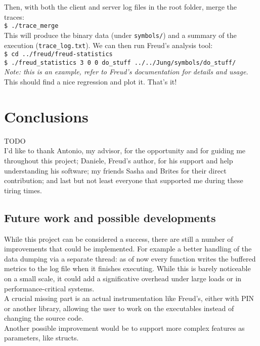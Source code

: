         Then, with both the client and server log files in the root folder, merge the traces:\\

        \texttt{\$ ./trace\_merge}\\

        This will produce the binary data (under \texttt{symbols/}) and a summary of the execution
        (\texttt{trace\_log.txt}).
        We can then run Freud's analysis tool:\\

        \texttt{\$ cd ../freud/freud-statistics}\\

        \texttt{\$ ./freud\_statistics 3 0 0 do\_stuff ../../Jung/symbols/do\_stuff/}\\
        
        \textit{Note: this is an example, refer to Freud's documentation for details and usage.}\\

        This should find a nice regression and plot it. That's it!


\chapter{Conclusions}


    TODO\\

    I'd like to thank Antonio, my advisor, for the opportunity and for guiding me throughout
    this project; Daniele, Freud's author, for his support and help
    understanding his software; my friends Sasha and Brites for their direct contribution;
    and last but not least everyone that supported me during these tiring times.


	\section{Future work and possible developments}

        While this project can be considered a success, there are still a number of improvements
        that could be implemented. For example a better handling of the data dumping via a separate thread:
        as of now every function writes the buffered metrics to the log file when it finishes executing. While this
        is barely noticeable on a small scale, it could add a significative overhead under large loads
        or in performance-critical systems.\\

        A crucial missing part is an actual instrumentation like Freud's, either with PIN or another
        library, allowing the user to work on the executables instead of changing the source code.\\

        Another possible improvement would be to support more complex features as parameters, like structs.
